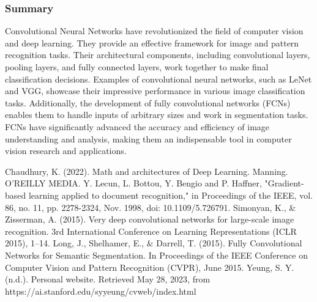 \documentclass[10pt, twocolumn]{article}
\begin{document}
\subsubsection{Summary}

Convolutional Neural Networks have revolutionized the field of
computer vision and deep learning. They provide an effective framework for
image and pattern recognition tasks. Their architectural components, including
convolutional layers, pooling layers, and fully connected layers, work together
to make final classification decisions. Examples of convolutional neural
networks, such as LeNet and VGG, showcase their impressive performance in
various image classification tasks. Additionally, the development of fully
convolutional networks (FCNs) enables them to handle inputs of arbitrary sizes
and work in segmentation tasks. FCNs have significantly advanced the accuracy
and efficiency of image understanding and analysis, making them an
indispensable tool in computer vision research and applications.





\newpage

\begin{thebibliography}{9}
 Chaudhury, K. (2022). Math and architectures of Deep Learning. Manning. O’REILLY MEDIA.  
 Y. Lecun, L. Bottou, Y. Bengio and P. Haffner, "Gradient-based learning applied to document recognition," in Proceedings of the IEEE, vol. 86, no. 11, pp. 2278-2324, Nov. 1998, doi: 10.1109/5.726791.
 Simonyan, K., & Zisserman, A. (2015). Very deep convolutional networks for large-scale image recognition. 3rd International Conference on Learning Representations (ICLR 2015), 1–14.
 Long, J., Shelhamer, E., & Darrell, T. (2015). Fully Convolutional Networks for Semantic Segmentation. In Proceedings of the IEEE Conference on Computer Vision and Pattern Recognition (CVPR), June 2015. 
 Yeung, S. Y. (n.d.). Personal website. Retrieved May 28, 2023, from https://ai.stanford.edu/syyeung/cvweb/index.html 
\end{thebibliography}
\end{document}
